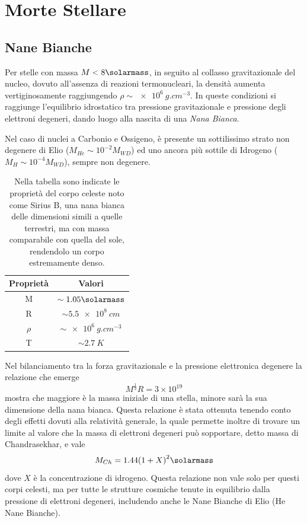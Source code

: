 \section{Morte Stellare}\label{sec:morte-stellare}
\subsection{Nane Bianche}\label{sec:nane-bianche}
Per stelle con massa $M < 8\si{\solarmass}$, in seguito al collasso gravitazionale del nucleo, dovuto all'assenza di reazioni termonucleari, la densità aumenta vertiginosamente raggiungendo $\rho \sim \SI{e6}{g.cm^{-3}}$. In queste condizioni si raggiunge l'equilibrio idrostatico tra pressione gravitazionale e pressione degli elettroni degeneri, dando luogo alla nascita di una \textit{Nana Bianca}.

Nel caso di nuclei a Carbonio e Ossigeno, è presente un sottilissimo strato non degenere di Elio ($M_{He} \sim 10^{-2} M_{WD}$) ed uno ancora più sottile di Idrogeno ($M_{H} \sim 10^{-4} M_{WD}$), sempre non degenere. 

\begin{table}
    \centering
    \caption{Nella tabella sono indicate le proprietà del corpo celeste noto come Sirius B, una nana bianca delle dimensioni simili a quelle terrestri, ma con massa comparabile con quella del sole, rendendolo un corpo estremamente denso.}\label{tab:sirius-b}
    \begin{tabular}{c|c}
        \toprule
        Proprietà & Valori\\
        \midrule
        M & $\sim 1.05 \si{\solarmass}$\\
        R & $\sim \SI{5.5 e8}{cm}$\\
        $\rho$ & $\sim \SI{e6}{g.cm^{-3}}$\\
        T & $\sim \SI{2.7}{K}$\\
        \bottomrule
    \end{tabular}
\end{table}

Nel bilanciamento tra la forza gravitazionale e la pressione elettronica degenere la relazione che emerge
\[
    M^{\frac{1}{3}}R = 3\times 10^{19}
\]
mostra che maggiore è la massa iniziale di una stella, minore sarà la sua dimensione della nana bianca. Questa relazione è stata ottenuta tenendo conto degli effetti dovuti alla relatività generale, la quale permette inoltre di trovare un limite al valore che la massa di elettroni degeneri può sopportare, detto massa di Chandrasekhar, e vale
\[
    M_{Ch} = 1.44{(1+X)}^2 \si{\solarmass}
\]
dove $X$ è la concentrazione di idrogeno.
Questa relazione non vale solo per questi corpi celesti, ma per tutte le strutture cosmiche tenute in equilibrio dalla pressione di elettroni degeneri, includendo anche le Nane Bianche di Elio (He Nane Bianche).

